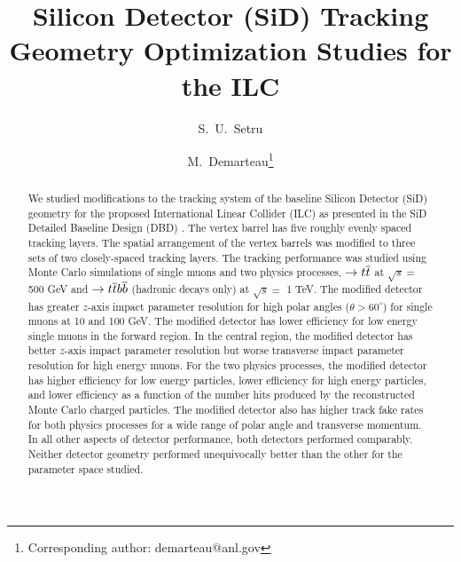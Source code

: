 \documentclass[12pt]{article}
\title{ \LARGE\bf Silicon Detector (SiD) Tracking Geometry Optimization Studies for the ILC}
\author[1]{S.~U.~Setru}
\author[1]{M.~Demarteau\thanks{Corresponding author: demarteau@anl.gov}}
\affil[1]{\footnotesize Argonne National Laboratory, 9700 South Cass Avenue, IL, USA}
\def\roots{ \sqrt{s} }
\def\GeV{ \mbox{GeV}}
\def\ee{\end{equation}}
\providecommand{\ee}   {\rm{e^+e^-}}
\newcommand{\ttbar}{ t \bar t}
\newcommand{\bbbar}{ b \bar b}
\def\IFIC{\footnote{IFIC, c/ Catedr\`atico Jos\'e Beltr\`an, 2  46980 Paterna, SPAIN} }
\def\Orsay{\footnote{LAL, Universit\'e Paris Sud, 
           F-91898 Orsay CEDEX, FRANCE}}
\begin{document}

\date{}

\maketitle
\thispagestyle{fancy}


\begin{abstract}
We studied modifications to the tracking system of 
the baseline Silicon Detector (SiD) geometry for the proposed International Linear Collider (ILC)
as presented in the SiD Detailed Baseline Design (DBD) \cite{Behnke:2013lya}.
The vertex barrel has five roughly evenly spaced tracking layers.
The spatial arrangement of the vertex barrels was modified
to three sets of
 two closely-spaced tracking layers.
The tracking performance was studied using Monte Carlo simulations 
of single muons and two physics processes, 
$\ee \rightarrow \ttbar$ at $ \sqrt{s} = $ 500 GeV and 
$\ee \rightarrow \ttbar \bbbar$ (hadronic decays only) at $ \sqrt{s} = $ 1 TeV.
The modified detector has greater $z$-axis 
impact parameter resolution for high polar angles ($\theta > 60^{\circ}$)
for single muons at 10 and 100 GeV.
The modified detector has lower efficiency for low energy single muons in the forward region.
In the central region, the modified detector has better $z$-axis impact parameter resolution
but worse transverse impact parameter
resolution for high energy muons.
For the two physics processes, the modified detector has
higher efficiency for low energy particles, lower efficiency
for high energy particles, and lower efficiency as a function of the number
hits produced by the reconstructed Monte Carlo charged particles.
The modified detector also has higher track fake rates
for both physics processes for a wide range
of polar angle and transverse momentum.
In all other aspects of detector performance,
both detectors performed comparably.
Neither detector geometry performed unequivocally better than the other
for the parameter space studied.
\end{abstract}
\end{document}
